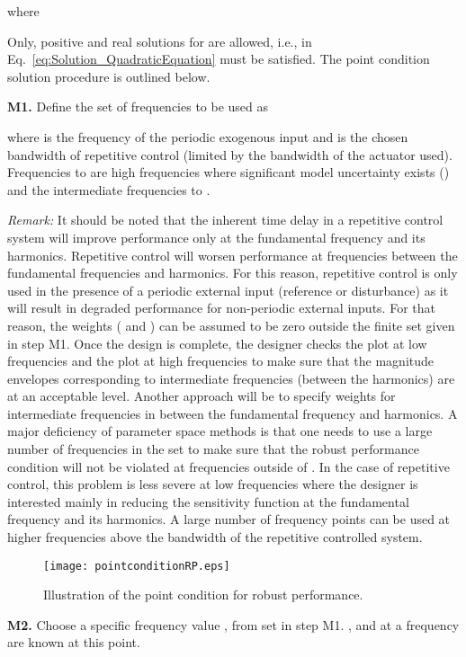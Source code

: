 \documentclass[12pt,draftcls,onecolumn]{IEEEtran}
\begin{document}
where


Only, positive and real solutions for  are allowed, i.e.,  in Eq.~\eqref{eq:Solution_QuadraticEquation} must be satisfied. The point condition solution procedure is outlined below.

\textbf{M1.} Define the set of frequencies to be used as

where  is the frequency of the periodic
exogenous input and   is the chosen
bandwidth of repetitive control (limited by the bandwidth of the
actuator used). Frequencies  to  are
high frequencies where significant model uncertainty exists
() and the intermediate frequencies
 to .

\emph{Remark:} It should be noted that the inherent time delay in
a repetitive control system will improve performance only at the
fundamental frequency  and its
harmonics. Repetitive control will worsen performance at
frequencies between the fundamental frequencies and harmonics. For
this reason, repetitive control is only used in the presence of a
periodic external input (reference or disturbance) as it will
result in degraded performance for non-periodic external inputs.
For that reason, the weights ( and ) can be assumed
to be zero outside the finite set  given in step M1. Once
the design is complete, the designer checks the  plot at low
frequencies and the  plot at high frequencies to make sure
that the magnitude envelopes corresponding to intermediate
frequencies (between the harmonics) are at an acceptable level.
Another approach will be to specify weights for intermediate
frequencies in between the fundamental frequency and harmonics. A
major deficiency of parameter space methods is that one needs to
use a large number of frequencies in the set  to make sure
that the robust performance condition will not be violated at
frequencies outside of . In the case of repetitive
control, this problem is less severe at low frequencies where the
designer is interested mainly in reducing the sensitivity function
at the fundamental frequency and its harmonics. A large number of
frequency points can be used at higher frequencies above the
bandwidth of the repetitive controlled system.

\begin{figure}\centering
    \texttt{[image: pointconditionRP.eps]}\\
    \caption{Illustration of the point condition for robust performance.}\end{figure}


\textbf{M2.} Choose a specific frequency value ,  from set  in step M1. , and  at a frequency  are known at this point.
\end{document}
